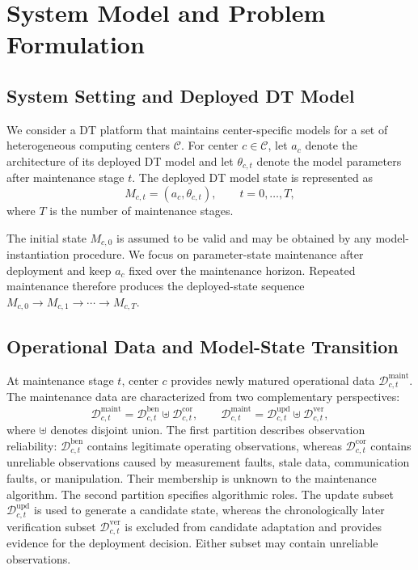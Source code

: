 \section{System Model and Problem Formulation}
\label{sec:problem}

\subsection{System Setting and Deployed DT Model}
We consider a DT platform that maintains center-specific models for a set of heterogeneous computing centers $\mathcal C$. For center $c\in\mathcal C$, let $a_c$ denote the architecture of its deployed DT model and let $\theta_{c,t}$ denote the model parameters after maintenance stage $t$. The deployed DT model state is represented as
\begin{equation}
M_{c,t}=(a_c,\theta_{c,t}),\qquad t=0,\ldots,T,
\label{eq:state}
\end{equation}
where $T$ is the number of maintenance stages.

The initial state $M_{c,0}$ is assumed to be valid and may be obtained by any model-instantiation procedure. We focus on parameter-state maintenance after deployment and keep $a_c$ fixed over the maintenance horizon. Repeated maintenance therefore produces the deployed-state sequence $M_{c,0}\rightarrow M_{c,1}\rightarrow\cdots\rightarrow M_{c,T}$.

\subsection{Operational Data and Model-State Transition}
At maintenance stage $t$, center $c$ provides newly matured operational data $\mathcal D^{\mathrm{maint}}_{c,t}$. The maintenance data are characterized from two complementary perspectives:
\begin{equation}
\mathcal D^{\mathrm{maint}}_{c,t}
=\mathcal D^{\mathrm{ben}}_{c,t}\uplus\mathcal D^{\mathrm{cor}}_{c,t},
\qquad
\mathcal D^{\mathrm{maint}}_{c,t}
=\mathcal D^{\mathrm{upd}}_{c,t}\uplus\mathcal D^{\mathrm{ver}}_{c,t},
\label{eq:data}
\end{equation}
where $\uplus$ denotes disjoint union. The first partition describes observation reliability: $\mathcal D^{\mathrm{ben}}_{c,t}$ contains legitimate operating observations, whereas $\mathcal D^{\mathrm{cor}}_{c,t}$ contains unreliable observations caused by measurement faults, stale data, communication faults, or manipulation. Their membership is unknown to the maintenance algorithm. The second partition specifies algorithmic roles. The update subset $\mathcal D^{\mathrm{upd}}_{c,t}$ is used to generate a candidate state, whereas the chronologically later verification subset $\mathcal D^{\mathrm{ver}}_{c,t}$ is excluded from candidate adaptation and provides evidence for the deployment decision. Either subset may contain unreliable observations.

